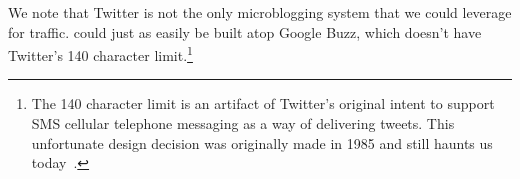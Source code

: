 We note that Twitter is not the only microblogging system that we could
leverage for \hoot traffic. \hoot could just as easily be built atop
Google Buzz, which doesn't have Twitter's 140 character limit.\footnote{The 140 character limit is an
  artifact of Twitter's original intent to support SMS cellular
  telephone messaging as a way of delivering tweets. This unfortunate design decision
  was originally made in 1985 and still haunts us today~\cite{latimes-char160}.}
